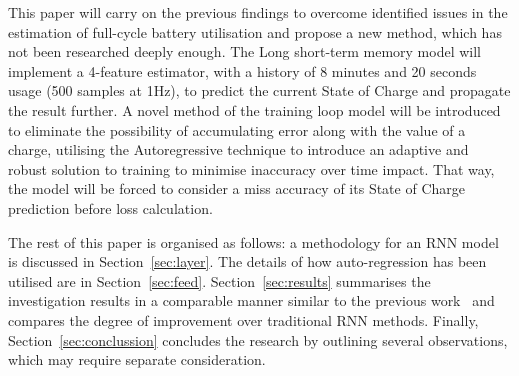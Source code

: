 %
This paper will carry on the previous findings to overcome identified issues in the estimation of full-cycle battery utilisation and propose a new method, which has not been researched deeply enough.
The Long short-term memory model will implement a 4-feature estimator, with a history of 8 minutes and 20 seconds usage (500 samples at 1Hz), to predict the current State of Charge and propagate the result further.
A novel method of the training loop model will be introduced to eliminate the possibility of accumulating error along with the value of a charge, utilising the Autoregressive technique to introduce an adaptive and robust solution to training to minimise inaccuracy over time impact.
That way, the model will be forced to consider a miss accuracy of its State of Charge prediction before loss calculation.

%
%
The rest of this paper is organised as follows: a methodology for an RNN model is discussed in Section~\ref{sec:layer}.
The details of how auto-regression has been utilised are in Section~\ref{sec:feed}.
Section~\ref{sec:results} summarises the investigation results in a comparable manner similar to the previous work~\cite{sadykov_practical_2022} and compares the degree of improvement over traditional RNN methods.
Finally, Section~\ref{sec:conclussion} concludes the research by outlining several observations, which may require separate consideration.
